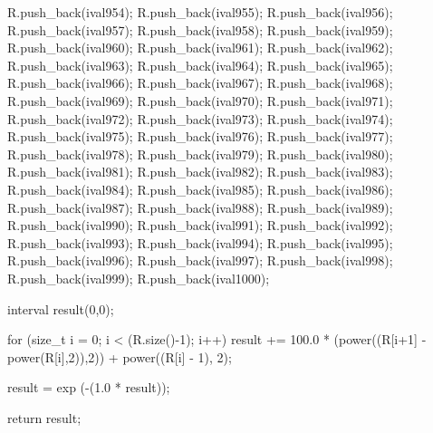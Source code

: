 \begin{DoxyCode}
{R.push_back(ival954);
R.push_back(ival955);
R.push_back(ival956);
R.push_back(ival957);
R.push_back(ival958);
R.push_back(ival959);
R.push_back(ival960);
R.push_back(ival961);
R.push_back(ival962);
R.push_back(ival963);
R.push_back(ival964);
R.push_back(ival965);
R.push_back(ival966);
R.push_back(ival967);
R.push_back(ival968);
R.push_back(ival969);
R.push_back(ival970);
R.push_back(ival971);
R.push_back(ival972);
R.push_back(ival973);
R.push_back(ival974);
R.push_back(ival975);
R.push_back(ival976);
R.push_back(ival977);
R.push_back(ival978);
R.push_back(ival979);
R.push_back(ival980);
R.push_back(ival981);
R.push_back(ival982);
R.push_back(ival983);
R.push_back(ival984);
R.push_back(ival985);
R.push_back(ival986);
R.push_back(ival987);
R.push_back(ival988);
R.push_back(ival989);
R.push_back(ival990);
R.push_back(ival991);
R.push_back(ival992);
R.push_back(ival993);
R.push_back(ival994);
R.push_back(ival995);
R.push_back(ival996);
R.push_back(ival997);
R.push_back(ival998);
R.push_back(ival999);
R.push_back(ival1000);

    interval result(0,0);
    
    for (size_t i = 0; i < (R.size()-1); i++) 
    {
      result += 100.0 * (power((R[i+1] - power(R[i],2)),2)) +
                  power((R[i] - 1), 2);
    }
  
  result = exp (-(1.0 * result));
  
  return result;
  
}
\end{DoxyCode}
